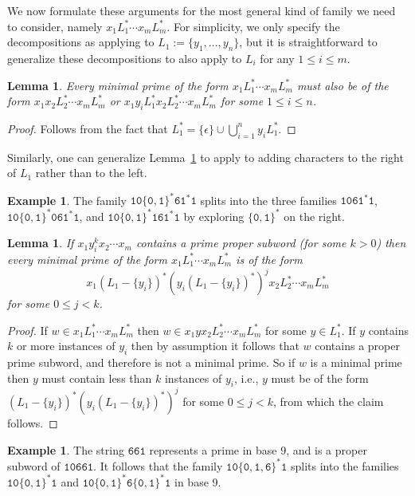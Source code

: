 \documentclass[12pt]{article}
\theoremstyle{plain}
\newtheorem{lemma}[theorem]{Lemma}
\theoremstyle{definition}
\newtheorem{example}[theorem]{Example}
\theoremstyle{remark}
\newcommand{\0}{\mathtt{0}}
\newcommand{\1}{\mathtt{1}}
\newcommand{\2}{\mathtt{2}}
\newcommand{\3}{\mathtt{3}}
\newcommand{\4}{\mathtt{4}}
\newcommand{\5}{\mathtt{5}}
\newcommand{\6}{\mathtt{6}}
\newcommand{\7}{\mathtt{7}}
\newcommand{\8}{\mathtt{8}}
\newcommand{\9}{\mathtt{9}}
\begin{document}
We now formulate these arguments for the most general kind of family we need to consider, namely
$x_1L_1^*\dotsm x_mL_m^*$.  For simplicity, we only specify the decompositions as applying to
$L_1:=\{y_1,\dotsc,y_n\}$, but it is straightforward to generalize these decompositions
to also apply to $L_i$ for any $1\leq i\leq m$.

\begin{lemma}\label{lemexplore}
Every minimal prime of the form $x_1L_1^*\dotsm x_mL_m^*$ must also be of the form
$x_1x_2L_2^*\dotsm x_mL_m^*$ or $x_1y_iL_1^*x_2L_2^*\dotsm x_mL_m^*$ for some $1\leq i\leq n$.
\end{lemma}
\begin{proof}
Follows from the fact that $L_1^*=\{\epsilon\}\cup\bigcup_{i=1}^n y_iL_1^*$.
\end{proof}
Similarly, one can generalize Lemma~\ref{lemexplore} to apply to adding characters to the right of $L_1$ rather than
to the left.
\begin{example}
The family $\1\0\{\0,\1\}^*\6\1^*\1$ splits into the three families $\1\0\6\1^*\1$, $\1\0\{\0,\1\}^*\0\6\1^*\1$, and $\1\0\{\0,\1\}^*\1\6\1^*\1$
by exploring $\{\0,\1\}^*$ on the right.
\end{example}

\begin{lemma}\label{lemsplit1}
If $x_1y_i^kx_2\dotsm x_m$ contains a prime proper subword (for some $k>0$) then every minimal prime of the form
$x_1L_1^*\dotsm x_mL_m^*$ is of the form \[x_1(L_1-\{y_i\})^*(y_i(L_1-\{y_i\})^*)^jx_2L_2^*\dotsm x_mL_m^*\]
for some $0\leq j<k$.
\end{lemma}
\begin{proof}
If $w\in x_1L_1^*\dotsm x_mL_m^*$ then $w\in x_1yx_2L_2^*\dotsm x_mL_m^*$ for some $y\in L_1^*$.
If $y$ contains $k$ or more instances of $y_i$ then by assumption it follows that $w$ contains a proper prime subword,
and therefore is not a minimal prime.  So if $w$ is a minimal prime then $y$ must contain less than $k$
instances of $y_i$, i.e., $y$ must be of the form $(L_1-\{y_i\})^*(y_i(L_1-\{y_i\})^*)^j$ for some $0\leq j<k$,
from which the claim follows.
\end{proof}
\begin{example}
The string $\6\6\1$ represents a prime in base 9, and is a proper subword of $\1\0\6\6\1$.  It follows that
the family $\1\0\{\0,\1,\6\}^*\1$ splits into the families
$\1\0\{\0,\1\}^*\1$ and $\1\0\{\0,\1\}^*\6\{\0,\1\}^*\1$ in base 9.
\end{example}
\end{document}
